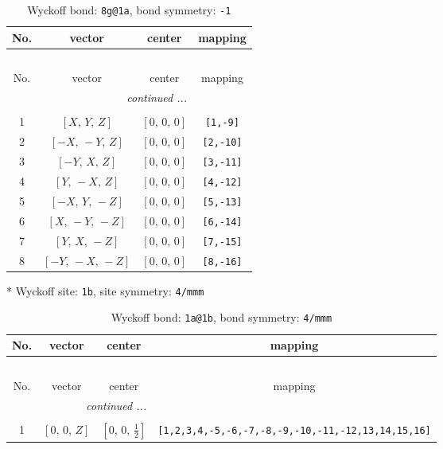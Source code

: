 \documentclass[fleqn,8pt]{jsarticle}
\begin{document}
\renewcommand{\arraystretch}{1.2}
\begin{longtable}{cccc}
\caption{Wyckoff bond: {\tt 8g@1a}, bond symmetry: {\tt -1}}
 \\
 \hline \hline
No. & vector & center & mapping \\ \hline \endfirsthead

\multicolumn{3}{l}{\tablename\ \thetable{}} \\
 \hline \hline
No. & vector & center & mapping \\ \hline \endhead

 \hline \hline
\multicolumn{3}{r}{\footnotesize\it continued ...} \\ \endfoot

 \hline \hline
\multicolumn{3}{r}{} \\ \endlastfoot

1 & $\left[ X,\, Y,\, Z \right]$ & $\left[ 0,\, 0,\, 0 \right]$ & {\tt [1,-9]} \\ \hline
2 & $\left[ - X,\, - Y,\, Z \right]$ & $\left[ 0,\, 0,\, 0 \right]$ & {\tt [2,-10]} \\ \hline
3 & $\left[ - Y,\, X,\, Z \right]$ & $\left[ 0,\, 0,\, 0 \right]$ & {\tt [3,-11]} \\ \hline
4 & $\left[ Y,\, - X,\, Z \right]$ & $\left[ 0,\, 0,\, 0 \right]$ & {\tt [4,-12]} \\ \hline
5 & $\left[ - X,\, Y,\, - Z \right]$ & $\left[ 0,\, 0,\, 0 \right]$ & {\tt [5,-13]} \\ \hline
6 & $\left[ X,\, - Y,\, - Z \right]$ & $\left[ 0,\, 0,\, 0 \right]$ & {\tt [6,-14]} \\ \hline
7 & $\left[ Y,\, X,\, - Z \right]$ & $\left[ 0,\, 0,\, 0 \right]$ & {\tt [7,-15]} \\ \hline
8 & $\left[ - Y,\, - X,\, - Z \right]$ & $\left[ 0,\, 0,\, 0 \right]$ & {\tt [8,-16]} \\
\end{longtable}
* Wyckoff site: {\tt 1b}, site symmetry: {\tt 4/mmm}
\renewcommand{\arraystretch}{1.2}
\begin{longtable}{cccc}
\caption{Wyckoff bond: {\tt 1a@1b}, bond symmetry: {\tt 4/mmm}}
 \\
 \hline \hline
No. & vector & center & mapping \\ \hline \endfirsthead

\multicolumn{3}{l}{\tablename\ \thetable{}} \\
 \hline \hline
No. & vector & center & mapping \\ \hline \endhead

 \hline \hline
\multicolumn{3}{r}{\footnotesize\it continued ...} \\ \endfoot

 \hline \hline
\multicolumn{3}{r}{} \\ \endlastfoot

1 & $\left[ 0,\, 0,\, Z \right]$ & $\left[ 0,\, 0,\, \frac{1}{2} \right]$ & {\tt [1,2,3,4,-5,-6,-7,-8,-9,-10,-11,-12,13,14,15,16]} \\
\end{longtable}
\end{document}
